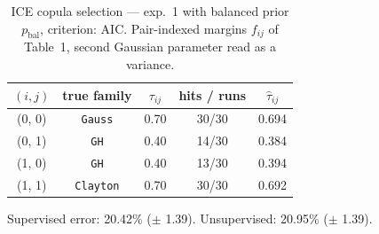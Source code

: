 \begin{table}[htbp]
  \centering
  \caption{ICE copula selection — exp.\ 1 with balanced prior $p_{\text{bal}}$, criterion: AIC. Pair-indexed margins $f_{ij}$ of Table~1, second Gaussian parameter read as a variance.}
  \label{tab:exp3-exp1_bal_p__aic}
  \begin{tabular}{ccccc}
    \toprule
    $(i, j)$ & true family & $\tau_{ij}$ & hits / runs & $\hat\tau_{ij}$ \\
    \midrule
    (0, 0) & \texttt{Gauss} & 0.70 & 30/30 & 0.694 \\
    (0, 1) & \texttt{GH} & 0.40 & 14/30 & 0.384 \\
    (1, 0) & \texttt{GH} & 0.40 & 13/30 & 0.394 \\
    (1, 1) & \texttt{Clayton} & 0.70 & 30/30 & 0.692 \\
    \bottomrule
  \end{tabular}
  \par\smallskip Supervised error: 20.42\% ($\pm$ 1.39). Unsupervised: 20.95\% ($\pm$ 1.39).
\end{table}
